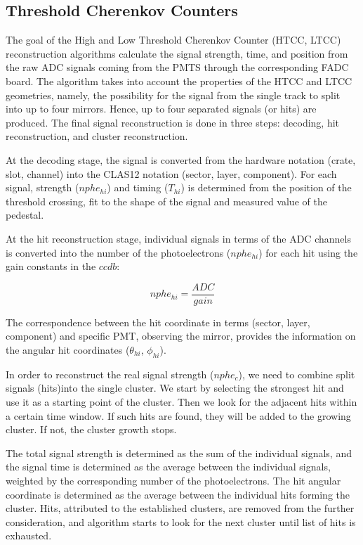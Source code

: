 \subsection{Threshold Cherenkov Counters}

The goal of the High and Low Threshold Cherenkov Counter (HTCC, LTCC) reconstruction algorithms
calculate the signal strength, time, and position from the
raw ADC signals coming from the PMTS through the corresponding FADC board. The algorithm takes into account
the properties of the HTCC and LTCC geometries, namely, the possibility for the signal from the single track to split into
up to four mirrors.
Hence, up to four separated signals (or hits) are produced. The final signal reconstruction is done in three
steps: decoding, hit reconstruction, and cluster reconstruction.

At the decoding stage, the signal is converted from the hardware notation (crate, slot, channel) into the CLAS12
notation (sector, layer, component).  For each signal, strength ($nphe_{hi}$) and timing ($T_{hi}$) is determined
from the position of the threshold crossing, fit to the shape of the signal and measured value of the pedestal.

At the hit reconstruction stage, individual signals in terms of the ADC channels is converted into the number of
the photoelectrons ($nphe_{hi}$) for each hit using the gain constants in the $ccdb$:

\begin{equation}
nphe_{hi} = \frac{ADC}{gain}
\end{equation}

The correspondence between the  hit coordinate in terms (sector, layer, component) and specific PMT, observing
the mirror,  provides the information on the angular hit coordinates ($\theta_{hi}$, $\phi_{hi}$).

In order to reconstruct the real signal strength ($nphe_c$), we need to combine split signals (hits)into the single
cluster. We start by selecting the strongest hit and use it as a starting point of the cluster. Then we look for the
adjacent hits within a certain time window.  If such hits are found, they will be added to the growing cluster. If
not, the cluster growth stops.

The total signal strength is determined as the sum of the individual signals, and the signal time is determined as
the average between the individual signals, weighted by the corresponding number of the photoelectrons. The hit
angular coordinate is determined as the average between the individual hits forming the cluster.  Hits, attributed
to the established clusters, are removed from the further consideration, and algorithm starts to look for the next
cluster until list of hits is exhausted.

